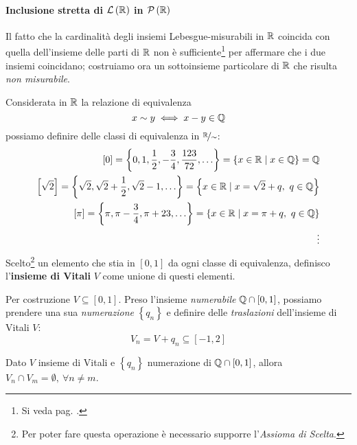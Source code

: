 \paragraph{Inclusione stretta di {$\mathcal{L}\left(\mathbb{R}\right)$} in {$\mathcal{P}\left(\mathbb{R}\right)$}} %
Il fatto che la cardinalità degli insiemi Lebesgue-misurabili in $\mathbb{R}$ coincida con quella dell'insieme delle parti di $\mathbb{R}$ non è sufficiente\footnote{Si veda pag. \pageref{cardinalitàugualenonimplicauguaglianzainsiemistica}.} per affermare che i due insiemi coincidano; costruiamo ora un sottoinsieme particolare di $\mathbb{R}$ che risulta \textit{non misurabile}.\\
\begin{define}
	Considerata in $\mathbb{R}$ la relazione di equivalenza
	\begin{equation}
		x\sim y\iff x-y\in\mathbb{Q}
	\end{equation}
	possiamo definire delle classi di equivalenza in $\nicefrac{\mathbb{R}}{\sim}$:
	\begin{align*}
		\left[0\right]=\left\{0,1,\frac{1}{2},-\frac{3}{4},\frac{123}{72},\ldots\right\}=\left\{x\in\mathbb{R}\mid x\in\mathbb{Q}\right\}=\mathbb{Q}\\
		\left[\sqrt{2}\right]=\left\{\sqrt{2},\sqrt{2}+\frac{1}{2},\sqrt{2}-1,\ldots\right\}=\left\{x\in\mathbb{R}\mid x=\sqrt{2}+q,\ q\in\mathbb{Q}\right\}\\
		\left[\pi\right]=\left\{\pi,\pi-\frac{3}{4},\pi+23,\ldots\right\}=\left\{x\in\mathbb{R}\mid x=\pi+q,\ q\in\mathbb{Q}\right\}\\
		\vdots
	\end{align*}
	Scelto\footnote{Per poter fare questa operazione è necessario supporre l'\textit{Assioma di Scelta}.} un elemento che stia in $\left[0,1\right]$ da ogni classe di equivalenza, definisco l'\textbf{insieme di Vitali} $V$ come unione di questi elementi.
\end{define}
Per costruzione $V\subseteq\left[0,1\right]$. Preso l'insieme \textit{numerabile} $\mathbb{Q}\cap\left[0,1\right]$, possiamo prendere una sua \textit{numerazione} $\left\{q_n\right\}$ e definire delle \textit{traslazioni} dell'insieme di Vitali $V$:
\begin{equation*}
	V_n=V+q_n\subseteq\left[-1,2\right]
\end{equation*}
\begin{lemming}
	Dato $V$ insieme di Vitali e $\left\{q_n\right\}$ numerazione di $\mathbb{Q}\cap\left[0,1\right]$, allora $V_n\cap V_m=\emptyset,\ \forall n\neq m$.
\end{lemming}
